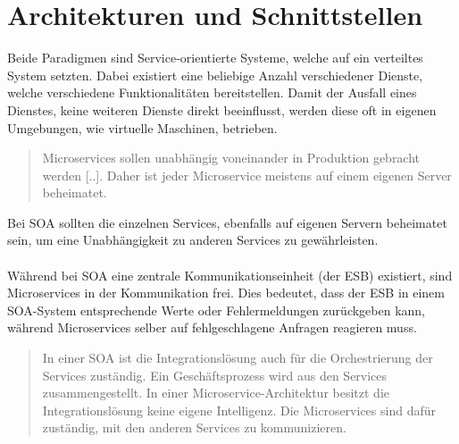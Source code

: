 \section{Architekturen und Schnittstellen}
\label{sec:ArchitekturenUndSchnittstellen}
Beide Paradigmen sind Service-orientierte Systeme, welche auf ein verteiltes System setzten. Dabei existiert eine beliebige Anzahl verschiedener Dienste, welche verschiedene Funktionalitäten bereitstellen. Damit der Ausfall eines Dienstes, keine weiteren Dienste direkt beeinflusst, werden diese oft in eigenen Umgebungen, wie virtuelle Maschinen, betrieben. 

\begin{quotation}
	\frqq Microservices sollen unabhängig voneinander in Produktion gebracht werden [..]. Daher ist jeder Microservice meistens auf einem eigenen Server beheimatet.\flqq\ \cite[S. 80]{EWolff2016:Microservices}
\end{quotation}

Bei SOA sollten die einzelnen Services, ebenfalls auf eigenen Servern beheimatet sein, um eine Unabhängigkeit zu anderen Services zu gewährleisten.
\\\\
Während bei SOA eine zentrale Kommunikationseinheit (der ESB) existiert, sind Microservices in der Kommunikation frei. Dies bedeutet, dass der ESB in einem SOA-System entsprechende Werte oder Fehlermeldungen zurückgeben kann, während Microservices selber auf fehlgeschlagene Anfragen reagieren muss.

\begin{quotation}
	\frqq In einer SOA ist die Integrationslösung auch für die Orchestrierung der Services zuständig. Ein Geschäftsprozess wird aus den Services zusammengestellt. In einer Microservice-Architektur besitzt die Integrationslösung keine eigene Intelligenz. Die Microservices sind dafür zuständig, mit den anderen Services zu kommunizieren.\flqq\ \cite[S. 89]{EWolff2016:Microservices}
\end{quotation}

